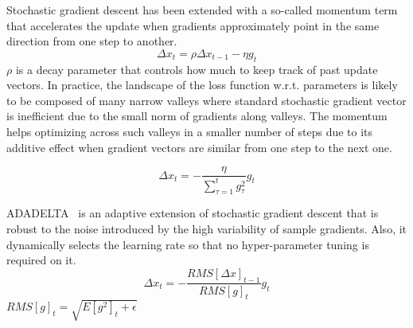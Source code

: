        Stochastic gradient descent has been extended with a so-called momentum term that accelerates
        the update when gradients approximately point in the same direction from one step to another.
        \begin{equation}
            \Delta x_t = \rho \Delta x_{t-1} - \eta g_t
        \end{equation}
        $\rho$ is a decay parameter that controls how much to keep track of past update vectors.
        In practice, the landscape of the loss function w.r.t. parameters is likely to be composed of many
        narrow valleys where standard stochastic gradient vector is inefficient due to the small norm of gradients
        along valleys. The momentum helps optimizing across such valleys in a smaller number of steps
        due to its additive effect when gradient vectors are similar from one step to the next one.



        \begin{equation}
            \Delta x_t = - \frac{\eta}{\sum\limits_{\tau=1}^t g_{\tau}^2} g_t
        \end{equation}

        ADADELTA~\cite{DBLP:journals/corr/abs-1212-5701} is an adaptive extension of stochastic gradient descent
        that is robust to the noise introduced by the high variability of sample gradients. Also, it dynamically
        selects the learning rate so that no hyper-parameter tuning is required on it.
        \begin{equation}
            \Delta x_t = - \frac{RMS[\Delta x]_{t-1}}{RMS[g]_t} g_t
        \end{equation}
        $RMS[g]_t = \sqrt{E[g^2]_t + \epsilon}$


